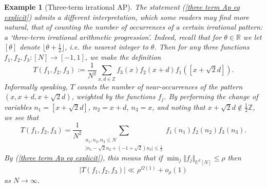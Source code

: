 \documentclass[12pt,a4paper,twoside,reqno]{amsart}
\newtheorem{Example}[Theorem]{Example}
\numberwithin{equation}{section}
\begin{document}
\begin{Example}[Three-term irrational AP]
\emph{The statement (\ref{three term Ap eq explicit}) admits a different interpretation, which some readers may find more natural, that of counting the number of occurrences of a certain irrational pattern: a `three-term irrational arithmetic progression'. Indeed, recall that for $\theta \in \mathbb{R}$ we let $[\theta]$ denote $\lfloor \theta +\frac{1}{2}\rfloor$, i.e. the nearest integer to $\theta$. Then for any three functions $f_1,f_2,f_3:[N]\longrightarrow [-1,1]$, we make the definition
\begin{equation}
\label{reparametrised three term AP}
T(f_1,f_2,f_3):=\frac{1}{N^2}\sum\limits_{x,d\in \mathbb{Z}} f_3(x)f_2(x+d)f_1([x+\sqrt{2} d]).
\end{equation} Informally speaking, $T$ counts the number of near-occurrences of the pattern $(x,x+d,x+\sqrt{2}d)$, weighted by the functions $f_j$. By performing the change of variables $n_1 = [ x+\sqrt 2 d]$, $n_2 = x+d$, $n_3 = x$, and noting that $x+\sqrt{2}d\notin \frac{1}{2}\mathbb{Z}$, we see that}
\begin{equation}
\label{relating T}
T(f_1,f_2,f_3)=\frac{1}{N^2}\sum\limits_{\substack{n_1,n_2,n_3\leqslant N\\ \vert n_1 - \sqrt{2}n_2 + (-1+\sqrt{2})n_3\vert\leqslant \frac{1}{2}} }f_1(n_1)f_2(n_2)f_3(n_3).
\end{equation} \emph{By (\ref{three term Ap eq explicit}), this means that if $\min_j\Vert f_j\Vert_{U^2[N]}\leqslant \rho$ then
\begin{equation}
\label{bound on T}
\vert T(f_1,f_2,f_3)\vert \ll \rho^{\Omega(1)} + o_{\rho}(1)
\end{equation} as $N\rightarrow \infty$.} \\


\end{Example}
\end{document}
